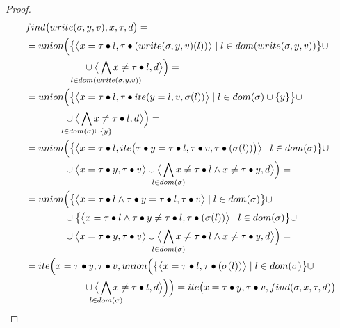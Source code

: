 \findwritelemma*
\begin{proof}
\begin{align*}
&\finD{\mutate{\sigma}{y}{v}}{x}{\tau}{d}=\\
&=\cmpbody{x}{\mutate{\sigma}{y}{v}}{\tau}{d}=\\
&=\Union{\big\{\paiR{\mg{x}{\fillterm{\tau}{l}}}{\fillterm{\tau}{\ite{\mg{y}{l}}{v}{\sigma(l)}}} \mid l\in\dom{\sigma}\cup\{y\} \big\}\cup\\
    &\qquad\qquad\cup\paiR{\bigwedge_{\mathclap{l\in\dom{\sigma}\cup\{y\}}}{\nmg{x}{\fillterm{\tau}{l}}}}{d}}=\\
&=\Union{\big\{\paiR{\mg{x}{\fillterm{\tau}{l}}}{\Ite{\mg{\fillterm{\tau}{y}}{\fillterm{\tau}{l}}}{\fillterm{\tau}{v}}{\fillterm{\tau}{(\sigma(l))}}} \mid l\in\dom{\sigma} \big\}\cup\\
	&\qquad\qquad\cup\paiR{\mg{x}{\fillterm{\tau}{y}}}{\fillterm{\tau}{v}}\cup\paiR{\bigwedge_{\mathclap{l\in\dom{\sigma}}}{\nmg{x}{\fillterm{\tau}{l}}}\wedge\nmg{x}{\fillterm{\tau}{y}}}{d}}=\\
&=\Union{\big\{\paiR{\mg{x}{\fillterm{\tau}{l}}\wedge\mg{\fillterm{\tau}{y}}{\fillterm{\tau}{l}}}{\fillterm{\tau}{v}} \mid l\in\dom{\sigma} \big\}\cup\\
    &\qquad\qquad\cup\big\{\paiR{\mg{x}{\fillterm{\tau}{l}}\wedge\nmg{\fillterm{\tau}{y}}{\fillterm{\tau}{l}}}{\fillterm{\tau}{(\sigma(l))}} \mid l\in\dom{\sigma} \big\}\cup\\
	&\qquad\qquad\cup\paiR{\mg{x}{\fillterm{\tau}{y}}}{\fillterm{\tau}{v}}\cup\paiR{\bigwedge_{\mathclap{l\in\dom{\sigma}}}{\nmg{x}{\fillterm{\tau}{l}}}\wedge\nmg{x}{\fillterm{\tau}{y}}}{d}}=\\
&=\ITE{\mg{x}{\fillterm{\tau}{y}}}{\fillterm{\tau}{v}}{\cmpbody{x}{\sigma}{\tau}{d}}=\Ite{\mg{x}{\fillterm{\tau}{y}}}{\fillterm{\tau}{v}}{\find{\sigma}{x}{\tau}{d}}
\end{align*}
\end{proof}
